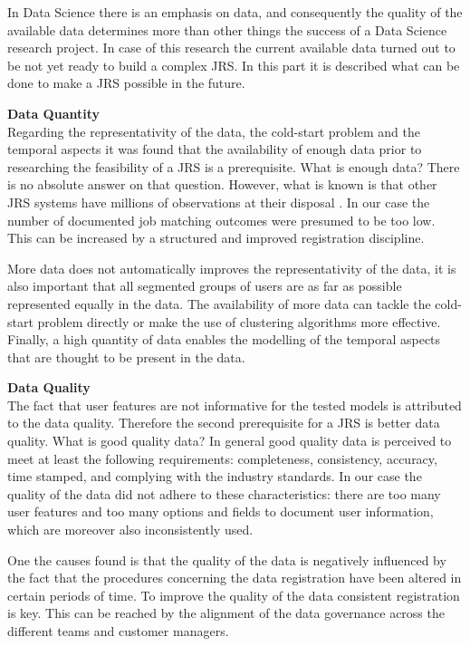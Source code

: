 In Data Science there is an emphasis on data, and consequently the quality of the available data determines more than other things the success of a Data Science research project.
In case of this research the current available data turned out to be not yet ready to build a complex JRS. 
In this part it is described what can be done to make a JRS possible in the future.

\noindent
\textbf{Data Quantity}\\
Regarding the representativity of the data, the cold-start problem and the temporal aspects it was found that the availability of enough data prior to researching the feasibility of a JRS is a prerequisite.
What is enough data?
There is no absolute answer on that question. 
However, what is known is that other JRS systems have millions of observations at their disposal \cite{kenthapadi2017personalized, T.Al-Otaibi2012ASystems, Zheng2012JobSurvey, hong2013job}.
In our case the number of documented job matching outcomes were presumed to be too low. 
This can be increased by a structured and improved registration discipline.

More data does not automatically improves the representativity of the data, it is also important that all segmented groups of users are as far as possible represented equally in the data.
The availability of more data can tackle the cold-start problem directly or make the use of clustering algorithms more effective. 
Finally, a high quantity of data enables the modelling of the temporal aspects that are thought to be present in the data.

\noindent
\textbf{Data Quality}\\
The fact that user features are not informative for the tested models is attributed to the data quality. 
Therefore the second prerequisite for a JRS is better data quality.
What is good quality data?
In general good quality data is perceived to meet at least the following requirements: completeness, consistency, accuracy, time stamped, and complying with the industry standards. 
In our case the quality of the data did not adhere to these characteristics: there are too many user features and too many options and fields to document user information, which are moreover also inconsistently used. 

One the causes found is that the quality of the data is negatively influenced by the fact that the procedures concerning the data registration have been altered in certain periods of time. 
To improve the quality of the data consistent registration is key.
This can be reached by the alignment of the data governance across the different teams and customer managers.

